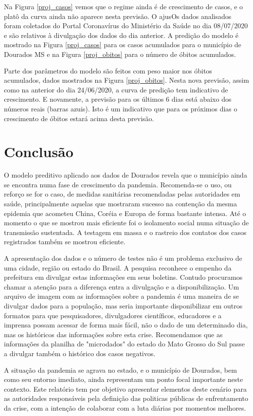 \documentclass[12pt]{article}
\begin{document}
Na Figura \ref{proj_casos} vemos que o regime ainda é de crescimento de casos, e o platô da curva ainda não aparece nesta previsão. O ajusOs dados analisados foram coletados do Portal Coronavírus do Ministério da Saúde \cite{minsaude} no dia 08/07/2020 e são relativos à divulgação dos dados do dia anterior. A predição do modelo é mostrado na Figura \ref{proj_casos} para os casos acumulados para o município de Dourados MS e na Figura \ref{proj_obitos} para o número de óbitos acumulados.

Parte dos parâmetros do modelo são feitos com peso maior nos óbitos acumulados, dados mostrados na Figura \ref{proj_obitos}. Nesta nova previsão, assim como na anterior do dia 24/06/2020, a curva de predição tem indicativo de crescimento. E novamente, a previsão para os últimos 6 dias está abaixo dos números reais (barras azuis). Isto é um indicativo que para os próximos dias o crescimento de óbitos estará acima desta previsão.   

\section{Conclusão}\label{conc}

O modelo preditivo aplicado aos dados de Dourados revela que o município ainda se encontra numa fase de crescimento da pandemia. Recomenda-se o uso, ou reforço se for o caso, de medidas sanitárias recomendadas pelas autoridades em saúde, principalmente aquelas que mostraram sucesso na contenção da mesma epidemia que acometeu China, Coréia e Europa de forma bastante intensa. Até o momento o que se mostrou mais eficiente foi o isolamento social numa situação de transmissão sustentada. A testagem em massa e o rastreio dos contatos dos casos registrados também se mostrou eficiente.

A apresentação dos dados e o número de testes não é um problema exclusivo de uma cidade, região ou estado do Brasil. A pesquisa reconhece o empenho da prefeitura em divulgar estas informações em seus boletins. Contudo procuramos chamar a atenção para a diferença entra a divulgação e a disponibilização. Um arquivo de imagem com as informações sobre a pandemia é uma maneira de se divulgar dados para a população, mas seria importante disponibilizar em outros formatos para que pesquisadores, divulgadores científicos, educadores e a imprensa possam acessar de forma mais fácil, não o dado de um determinado dia, mas os históricos das informações sobre esta crise. Recomendamos que as informações da planilha de "microdados" do estado do Mato Grosso do Sul passe a divulgar também o histórico dos casos negativos.

A situação da pandemia se agrava no estado, e o município de Dourados, bem como seu entorno imediato, ainda representam um ponto focal importante neste contexto. Este relatório tem por objetivo apresentar elementos deste cenário para as autoridades responsáveis pela definição das politicas públicas de enfrentamento da crise, com a intenção de colaborar com a luta diárias por momentos melhores.



\end{document}
